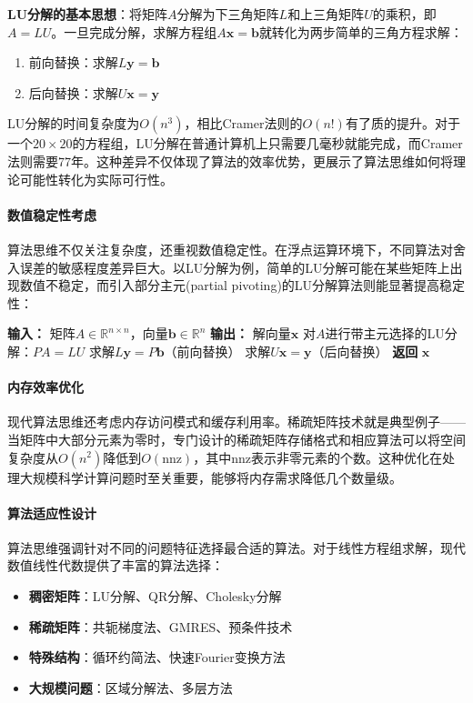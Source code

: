 \textbf{LU分解的基本思想}：将矩阵$A$分解为下三角矩阵$L$和上三角矩阵$U$的乘积，即$A = LU$。一旦完成分解，求解方程组$A\mathbf{x} = \mathbf{b}$就转化为两步简单的三角方程求解：
\begin{enumerate}
\item 前向替换：求解$L\mathbf{y} = \mathbf{b}$
\item 后向替换：求解$U\mathbf{x} = \mathbf{y}$
\end{enumerate}

LU分解的时间复杂度为$O(n^3)$，相比Cramer法则的$O(n!)$有了质的提升。对于一个$20 \times 20$的方程组，LU分解在普通计算机上只需要几毫秒就能完成，而Cramer法则需要77年。这种差异不仅体现了算法的效率优势，更展示了算法思维如何将理论可能性转化为实际可行性。

\paragraph{数值稳定性考虑}
算法思维不仅关注复杂度，还重视数值稳定性。在浮点运算环境下，不同算法对舍入误差的敏感程度差异巨大。以LU分解为例，简单的LU分解可能在某些矩阵上出现数值不稳定，而引入部分主元(partial pivoting)的LU分解算法则能显著提高稳定性：

\begin{algorithmic}[1]
\STATE \textbf{输入：} 矩阵$A \in \mathbb{R}^{n \times n}$，向量$\mathbf{b} \in \mathbb{R}^n$
\STATE \textbf{输出：} 解向量$\mathbf{x}$
\STATE 对$A$进行带主元选择的LU分解：$PA = LU$
\STATE 求解$L\mathbf{y} = P\mathbf{b}$（前向替换）
\STATE 求解$U\mathbf{x} = \mathbf{y}$（后向替换）
\STATE \textbf{返回} $\mathbf{x}$
\end{algorithmic}

\paragraph{内存效率优化}
现代算法思维还考虑内存访问模式和缓存利用率。稀疏矩阵技术就是典型例子——当矩阵中大部分元素为零时，专门设计的稀疏矩阵存储格式和相应算法可以将空间复杂度从$O(n^2)$降低到$O(\text{nnz})$，其中nnz表示非零元素的个数。这种优化在处理大规模科学计算问题时至关重要，能够将内存需求降低几个数量级。

\paragraph{算法适应性设计}
算法思维强调针对不同的问题特征选择最合适的算法。对于线性方程组求解，现代数值线性代数提供了丰富的算法选择：
\begin{itemize}
\item \textbf{稠密矩阵}：LU分解、QR分解、Cholesky分解
\item \textbf{稀疏矩阵}：共轭梯度法、GMRES、预条件技术
\item \textbf{特殊结构}：循环约简法、快速Fourier变换方法
\item \textbf{大规模问题}：区域分解法、多层方法
\end{itemize}

